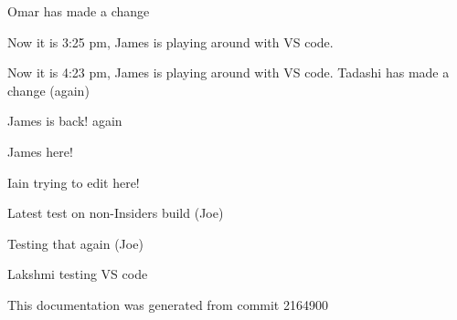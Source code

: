 \label{index_md_repo_README}%
%
Omar has made a change

Now it is 3\+:25 pm, James is playing around with VS code.

Now it is 4\+:23 pm, James is playing around with VS code. Tadashi has made a change (again)

James is back! again

James here!

Iain trying to edit here!

Latest test on non-\/\+Insiders build (Joe)

Testing that again (Joe)

Lakshmi testing VS code

This documentation was generated from commit 2164900 